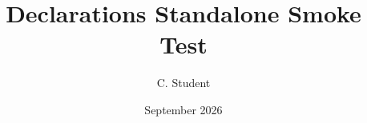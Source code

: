 \documentclass[a4paper,12pt]{article}
\title{Declarations Standalone Smoke Test}
\author{C. Student}
\date{September 2026}
\begin{document}
\maketitle
\statementspage
\end{document}
